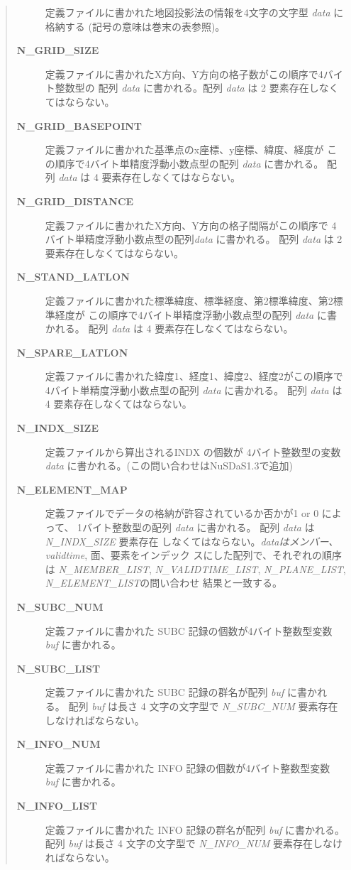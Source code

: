 \begin{quote}
\begin{description}
定義ファイルに書かれた地図投影法の情報を4文字の文字型 {\it data} に格納する
(記号の意味は巻末の表参照)。
\item[{\bf  N\_GRID\_SIZE }] 
定義ファイルに書かれたX方向、Y方向の格子数がこの順序で4バイト整数型の
配列 {\it data} に書かれる。配列 {\it data} は 2 要素存在しなくてはならない。
\item[{\bf  N\_GRID\_BASEPOINT }] 
定義ファイルに書かれた基準点のx座標、y座標、緯度、経度が
この順序で4バイト単精度浮動小数点型の配列 {\it data} に書かれる。
配列 {\it data} は 4 要素存在しなくてはならない。
\item[{\bf  N\_GRID\_DISTANCE }] 
定義ファイルに書かれたX方向、Y方向の格子間隔がこの順序で
4バイト単精度浮動小数点型の配列{\it data} に書かれる。
配列 {\it data} は 2 要素存在しなくてはならない。
\item[{\bf  N\_STAND\_LATLON }] 
定義ファイルに書かれた標準緯度、標準経度、第2標準緯度、第2標準経度が
この順序で4バイト単精度浮動小数点型の配列 {\it data} に書かれる。
配列 {\it data} は 4 要素存在しなくてはならない。
\item[{\bf  N\_SPARE\_LATLON }] 
定義ファイルに書かれた緯度1、経度1、緯度2、経度2がこの順序で
4バイト単精度浮動小数点型の配列 {\it data} に書かれる。
配列 {\it data} は 4 要素存在しなくてはならない。
\item[{\bf  N\_INDX\_SIZE }] 
定義ファイルから算出されるINDX の個数が 4バイト整数型の変数 {\it data} 
に書かれる。(この問い合わせはNuSDaS1.3で追加)
\item[{\bf  N\_ELEMENT\_MAP }] 
定義ファイルでデータの格納が許容されているか否かが1 or 0 によって、
1バイト整数型の配列 {\it data} に書かれる。
配列 {\it data} は {\it N\_INDX\_SIZE} 要素存在
しなくてはならない。{\it dataはメンバー、validtime}, 面、要素をインデック
スにした配列で、それぞれの順序は {\it N\_MEMBER\_LIST}, 
{\it N\_VALIDTIME\_LIST}, {\it N\_PLANE\_LIST}, {\it N\_ELEMENT\_LIST}の問い合わせ
結果と一致する。
\item[{\bf N\_SUBC\_NUM}] 
定義ファイルに書かれた SUBC 記録の個数が4バイト整数型変数 {\it buf} に書かれる。
\item[{\bf N\_SUBC\_LIST}] 
定義ファイルに書かれた SUBC 記録の群名が配列 {\it buf} に書かれる。
配列 {\it buf} は長さ 4 文字の文字型で
{\it N\_SUBC\_NUM} 要素存在しなければならない。
\item[{\bf N\_INFO\_NUM}] 
定義ファイルに書かれた INFO 記録の個数が4バイト整数型変数 {\it buf} に書かれる。
\item[{\bf N\_INFO\_LIST}] 
定義ファイルに書かれた INFO 記録の群名が配列 {\it buf} に書かれる。
配列 {\it buf} は長さ 4 文字の文字型で
{\it N\_INFO\_NUM} 要素存在しなければならない。
\end{description}\end{quote}
